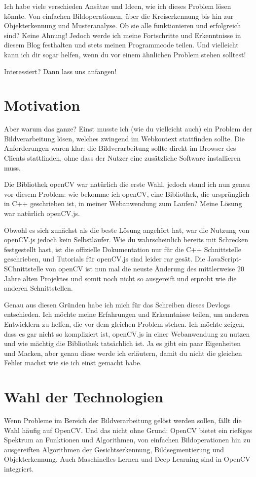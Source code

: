 \documentclass{article}
\begin{document}
Ich habe viele verschieden Ansätze und Ideen, wie ich dieses Problem lösen könnte. Von einfachen Bildoperationen, über die Kreiserkennung bis hin zur Objekterkennung und Musteranalyse. Ob sie alle funktionieren und erfolgreich sind? Keine Ahnung! Jedoch werde ich meine Fortschritte und Erkenntnisse in diesem Blog festhalten und stets meinen Programmcode teilen. Und vielleicht kann ich dir sogar helfen, wenn du vor einem ähnlichen Problem stehen solltest!

Interessiert? Dann lass uns anfangen!
\section{Motivation}
Aber warum das ganze? Einst musste ich (wie du vielleicht auch) ein Problem der Bildverarbeitung lösen, welches zwingend im Webkontext stattfinden sollte. Die Anforderungen waren klar: die Bildverarbeitung sollte direkt im Browser des Clients stattfinden, ohne dass der Nutzer eine zusätzliche Software installieren muss. 

Die Bibliothek openCV war natürlich die erste Wahl, jedoch stand ich nun genau vor diesem Problem: wie bekomme ich openCV, eine Bibliothek, die ursprünglich in C++ geschrieben ist, in meiner Webanwendung zum Laufen? Meine Lösung war natürlich openCV.js.

Obwohl es sich zunächst als die beste Lösung angehört hat, war die Nutzung von openCV.js jedoch kein Selbstläufer. Wie du wahrscheinlich bereits mit Schrecken festgestellt hast, ist die offizielle Dokumentation nur für die C++ Schnittstelle geschrieben, und Tutorials für openCV.js sind leider rar gesät. Die JavaScript-SChnittstelle von openCV ist nun mal die neuste Änderung des mittlerweise 20 Jahre alten Projektes und somit noch nicht so ausgereift und erprobt wie die anderen Schnittstellen.

Genau aus diesen Gründen habe ich mich für das Schreiben dieses Devlogs entschieden. Ich möchte meine Erfahrungen und Erkenntnisse teilen, um anderen Entwicklern zu helfen, die vor dem gleichen Problem stehen. Ich möchte zeigen, dass es gar nicht so kompliziert ist, openCV.js in einer Webanwendung zu nutzen und wie mächtig die Bibliothek tatsächlich ist. Ja es gibt ein paar Eigenheiten und Macken, aber genau diese werde ich erläutern, damit du nicht die gleichen Fehler machst wie sie ich einst gemacht habe.
\section{Wahl der Technologien}
Wenn Probleme im Bereich der Bildverarbeitung gelöst werden sollen, fällt die Wahl häufig auf OpenCV. Und das nicht ohne Grund: OpenCV bietet ein rießiges Spektrum an Funktionen und Algorithmen, von einfachen Bildoperationen hin zu ausgereiften Algorithmen der Gesichtserkennung, Bildsegmentierung und Objekterkennung. Auch Maschinelles Lernen und Deep Learning sind in OpenCV integriert.
\end{document}
